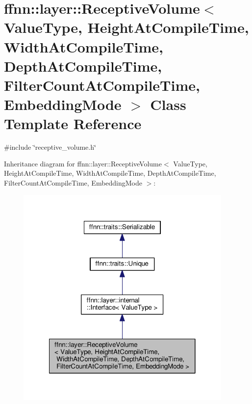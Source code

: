 \hypertarget{classffnn_1_1layer_1_1_receptive_volume}{\section{ffnn\-:\-:layer\-:\-:Receptive\-Volume$<$ Value\-Type, Height\-At\-Compile\-Time, Width\-At\-Compile\-Time, Depth\-At\-Compile\-Time, Filter\-Count\-At\-Compile\-Time, Embedding\-Mode $>$ Class Template Reference}
\label{classffnn_1_1layer_1_1_receptive_volume}
}


{\ttfamily \#include \char`\"{}receptive\-\_\-volume.\-h\char`\"{}}



Inheritance diagram for ffnn\-:\-:layer\-:\-:Receptive\-Volume$<$ Value\-Type, Height\-At\-Compile\-Time, Width\-At\-Compile\-Time, Depth\-At\-Compile\-Time, Filter\-Count\-At\-Compile\-Time, Embedding\-Mode $>$\-:\nopagebreak
\begin{figure}[H]
\begin{center}
\leavevmode
\includegraphics[width=302pt]{classffnn_1_1layer_1_1_receptive_volume__inherit__graph}
\end{center}
\end{figure}



